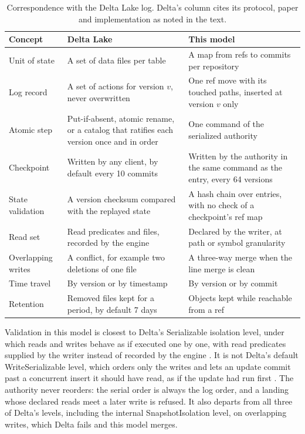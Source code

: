 \documentclass[11pt,letterpaper]{article}
\theoremstyle{definition}
\theoremstyle{remark}
\begin{document}
\begin{table}[t]
\centering
\small
\caption{Correspondence with the Delta Lake log. Delta's column cites its protocol, paper and implementation as noted in the text.}
\label{tab:tlsc:delta}
\begin{tabularx}{\textwidth}{@{}L{2.6cm}XX@{}}
\toprule
Concept & Delta Lake & This model \\
\midrule
Unit of state & A set of data files per table & A map from refs to commits per repository \\
Log record & A set of actions for version $v$, never overwritten & One ref move with its touched paths, inserted at version $v$ only \\
Atomic step & Put-if-absent, atomic rename, or a catalog that ratifies each version once and in order & One command of the serialized authority \\
Checkpoint & Written by any client, by default every 10 commits & Written by the authority in the same command as the entry, every 64 versions \\ %
State validation & A version checksum compared with the replayed state & A hash chain over entries, with no check of a checkpoint's ref map \\
Read set & Read predicates and files, recorded by the engine & Declared by the writer, at path or symbol granularity \\
Overlapping writes & A conflict, for example two deletions of one file & A three-way merge when the line merge is clean \\
Time travel & By version or by timestamp & By version or by commit \\
Retention & Removed files kept for a period, by default 7 days & Objects kept while reachable from a ref \\
\bottomrule
\end{tabularx}
\end{table}

Validation in this model is closest to Delta's Serializable isolation level, under which reads and writes behave as if executed one by one, with read predicates supplied by the writer instead of recorded by the engine \cite{deltaisolationsrc}. It is not Delta's default WriteSerializable level, which orders only the writes and lets an update commit past a concurrent insert it should have read, as if the update had run first \cite{deltaisolationsrc}. The authority never reorders: the serial order is always the log order, and a landing whose declared reads meet a later write is refused. It also departs from all three of Delta's levels, including the internal SnapshotIsolation level, on overlapping writes, which Delta fails and this model merges.
\end{document}
